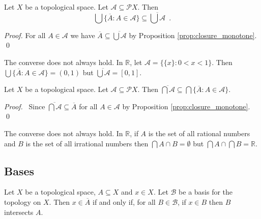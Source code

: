 \begin{prop}
Let $X$ be a topological space. Let $\mathcal{A} \subseteq \mathcal{P} X$. Then
\[ \bigcup \{ \overline{A} : A \in \mathcal{A} \} \subseteq \overline{\bigcup \mathcal{A}} \enspace . \]
\end{prop}

\begin{proof}
\pf
For all $A \in \mathcal{A}$ we have $\overline{A} \subseteq \overline{\bigcup \mathcal{A}}$ by Proposition \ref{prop:closure_monotone}. \qed
\end{proof}

\begin{ex}
The converse does not always hold. In $\mathbb{R}$, let $\mathcal{A} = \{ \{ x \} : 0 < x < 1 \}$. Then $\bigcup \{ \overline{A} : A \in \mathcal{A} \} = (0,1)$ but $\overline{\bigcup \mathcal{A}} = [0,1]$.
\end{ex}

\begin{prop}
Let $X$ be a topological space. Let $\mathcal{A} \subseteq \mathcal{P} X$. Then $\overline{\bigcap \mathcal{A}} \subseteq \bigcap \{ \overline{A} : A \in \mathcal{A} \}$.
\end{prop}

\begin{proof}
\pf\ Since $\overline{\bigcap \mathcal{A}} \subseteq \overline{A}$ for all $A \in \mathcal{A}$ by Proposition \ref{prop:closure_monotone}. \qed
\end{proof}

\begin{ex}
The converse does not always hold. In $\mathbb{R}$, if $A$ is the set of all rational numbers and $B$ is the set of all irrational numbers then $\bigcap{A \cap B} = \emptyset$ but $\bigcap{A} \cap \bigcap{B} = \mathbb{R}$.
\end{ex}

\subsection{Bases}

\begin{prop}
\label{prop:closure_basis}
Let $X$ be a topological space, $A \subseteq X$ and $x \in X$. Let $\mathcal{B}$ be a basis for the topology on $X$. Then $x \in \overline{A}$ if and only if, for all $B \in \mathcal{B}$, if $x \in B$ then $B$ intersects $A$.
\end{prop}

